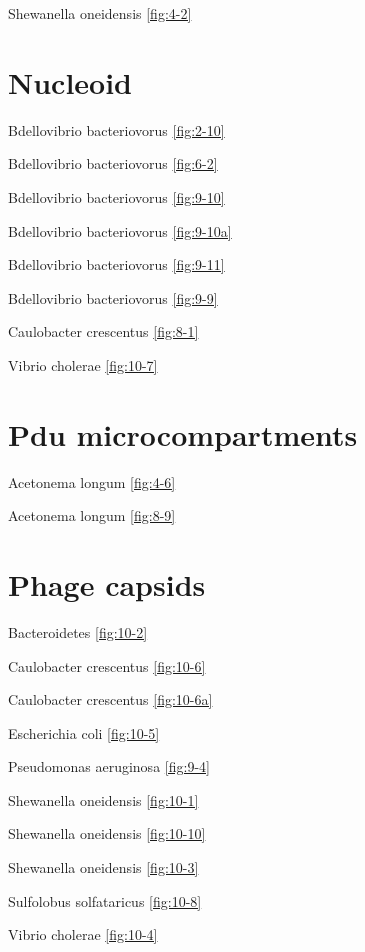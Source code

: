 \documentclass[]{tufte-book}
\begin{document}
Shewanella oneidensis \ref{fig:4-2}

\hypertarget{nucleoid-1}{%
\section*{Nucleoid}\label{nucleoid-1}}

Bdellovibrio bacteriovorus \ref{fig:2-10}

Bdellovibrio bacteriovorus \ref{fig:6-2}

Bdellovibrio bacteriovorus \ref{fig:9-10}

Bdellovibrio bacteriovorus \ref{fig:9-10a}

Bdellovibrio bacteriovorus \ref{fig:9-11}

Bdellovibrio bacteriovorus \ref{fig:9-9}

Caulobacter crescentus \ref{fig:8-1}

Vibrio cholerae \ref{fig:10-7}

\hypertarget{pdu-microcompartments}{%
\section*{Pdu microcompartments}\label{pdu-microcompartments}}

Acetonema longum \ref{fig:4-6}

Acetonema longum \ref{fig:8-9}

\hypertarget{phage-capsids}{%
\section*{Phage capsids}\label{phage-capsids}}

Bacteroidetes \ref{fig:10-2}

Caulobacter crescentus \ref{fig:10-6}

Caulobacter crescentus \ref{fig:10-6a}

Escherichia coli \ref{fig:10-5}

Pseudomonas aeruginosa \ref{fig:9-4}

Shewanella oneidensis \ref{fig:10-1}

Shewanella oneidensis \ref{fig:10-10}

Shewanella oneidensis \ref{fig:10-3}

Sulfolobus solfataricus \ref{fig:10-8}

Vibrio cholerae \ref{fig:10-4}
\end{document}
